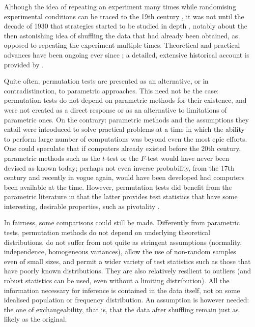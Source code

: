 Although the idea of repeating an experiment many times while randomising experimental conditions can be traced to the 19th century \citep{Peirce1884}, it was not until the decade of 1930 that strategies started to be studied in depth \citep{Fisher1935, Pitman1937-I, Pitman1937-II, Pitman1938}, notably about the then astonishing idea of shuffling the data that had already been obtained, as opposed to repeating the experiment multiple times. Theoretical and practical advances have been ongoing ever since \citep{Pearson1937, Scheffe1943, Lehmann1949, Kempthorne1955, Freedman1983, Westfall1993, Edgington1995, Good2002, Good2005, Westfall2008, Pesarin2010}; a detailed, extensive historical account is provided by \citet{Berry2014}.

Quite often, permutation tests are presented as an alternative, or in contradistinction, to parametric approaches. This need not be the case: permutation tests do not depend on parametric methods for their existence, and were not created as a direct response or as an alternative to limitations of parametric ones. On the contrary: parametric methods and the assumptions they entail were introduced to solve practical problems at a time in which the ability to perform large number of computations was beyond even the most epic efforts. One could speculate that if computers already existed before the 20th century, parametric methods such as the $t$-test or the $F$-test would have never been devised as known today; perhaps not even inverse probability, from the 17th century and recently in vogue again, would have been developed had computers been available at the time. However, permutation tests did benefit from the parametric literature in that the latter provides test statistics that have some interesting, desirable properties, such as pivotality \citep{Hall1991}.

In fairness, some comparisons could still be made. Differently from parametric tests, permutation methods do not depend on underlying theoretical distributions, do not suffer from not quite as stringent assumptions (normality, independence, homogeneous variances), allow the use of non-random samples even of small sizes, and permit a wider variety of test statistics such as those that have poorly known distributions. They are also relatively resilient to outliers (and robust statistics can be used, even without a limiting distribution). All the information necessary for inference is contained in the data itself, not on some idealised population or frequency distribution. An assumption is however needed: the one of exchangeability, that is, that the data after shuffling remain just as likely as the original.

